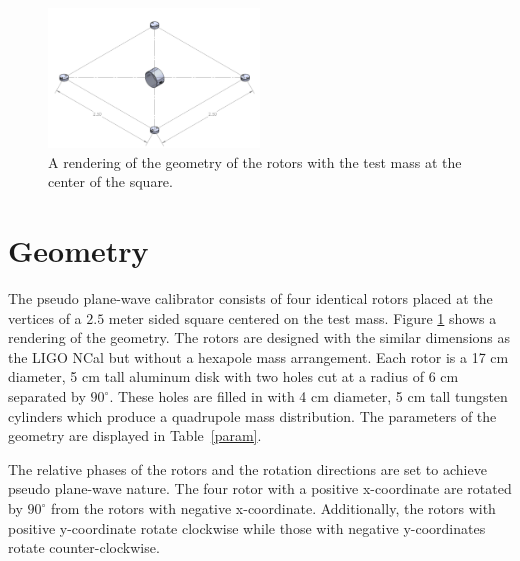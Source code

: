 \documentclass[superscriptaddress, twocolumn, prd]{revtex4-1}
\begin{document}
\begin{figure}[!h]
\centering \includegraphics[width=0.5\textwidth]{Super4_Model.pdf}
\caption{A rendering of the geometry of the rotors with the test mass at the center of the square.}
\label{cad} 
\end{figure}

\section{Geometry}

The pseudo plane-wave calibrator consists of four identical rotors placed at the vertices of a $2.5$ meter sided square centered on the test mass. Figure \ref{cad} shows a rendering of the geometry. The rotors are designed with the similar dimensions as the LIGO NCal \cite{ncal} but without a hexapole mass arrangement. Each rotor is a 17 cm diameter, 5 cm tall aluminum disk with two holes cut at a radius of 6 cm separated by $90^\circ$. These holes are filled in with 4 cm diameter, 5 cm tall  tungsten cylinders which produce a quadrupole mass distribution. The parameters of the geometry are displayed in Table~\ref{param}.

The relative phases of the rotors and the rotation directions are set to achieve pseudo plane-wave nature. The four rotor with a positive x-coordinate are rotated by $90^\circ$ from the rotors with negative x-coordinate. Additionally, the rotors with positive y-coordinate rotate clockwise while those with negative y-coordinates rotate counter-clockwise. 
\end{document}
